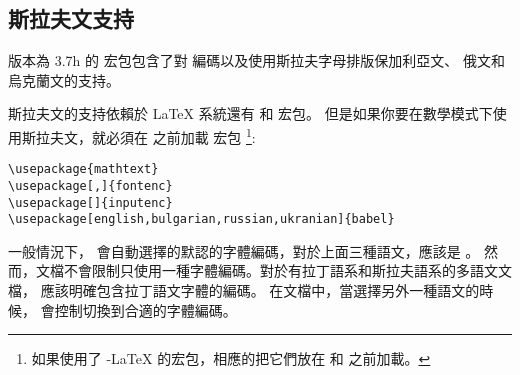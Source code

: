 \subsection{斯拉夫文支持}

版本為 3.7h 的  宏包包含了對  編碼以及使用斯拉夫字母排版保加利亞文、
俄文和烏克蘭文的支持。

斯拉夫文的支持依賴於 \LaTeX{} 系統還有  和  宏包。
但是如果你要在數學模式下使用斯拉夫文，就必須在  之前加載  宏包
\footnote{如果使用了 \AmS-\LaTeX{} 的宏包，相應的把它們放在  和  之前加載。}:
\begin{lscommand}
\verb+\usepackage{mathtext}+\\
\verb+\usepackage[+\verb+,+\verb+]{fontenc}+\\
\verb+\usepackage[+\verb+]{inputenc}+\\
\verb+\usepackage[english,bulgarian,russian,ukranian]{babel}+
\end{lscommand}

一般情況下， 會自動選擇的默認的字體編碼，對於上面三種語文，應該是 。
然而，文檔不會限制只使用一種字體編碼。對於有拉丁語系和斯拉夫語系的多語文文檔，
應該明確包含拉丁語文字體的編碼。
在文檔中，當選擇另外一種語文的時候， 會控制切換到合適的字體編碼。

